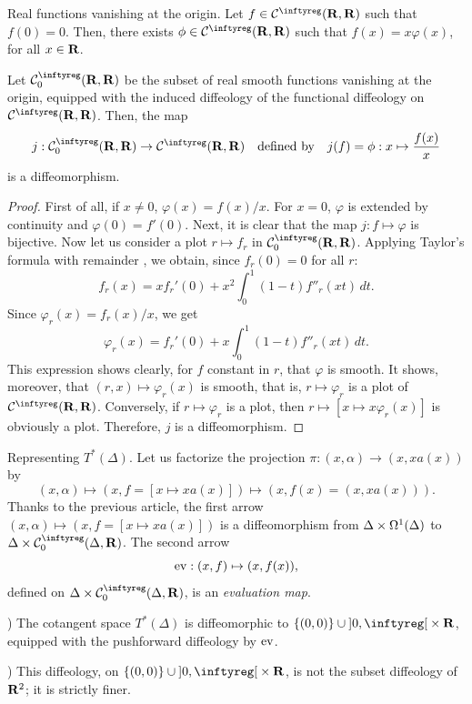 \begin{Article}{Real functions vanishing at the origin.}{}
  Let $f \in \Cinfty(\RR,\RR)$ such that $f(0)=0$.
  Then,
  there exists $\varphi \in \Cinfty(\RR,\RR)$ such that $f(x)=x\varphi(x)$,
  for all $x \in \mathbf{R}$.
  
  Let $\Cinfty_0(\RR,\RR)$ be the subset of real smooth functions vanishing at the origin,
  equipped with the induced diffeology of the functional diffeology on $\Cinfty(\RR,\RR)$.
  Then, the map
  $$
    j : \Cinfty_0(\RR,\RR) \to \Cinfty(\RR,\RR)
    \quad \mbox{defined by} \quad
    j(f) = \varphi : x \mapsto {f(x) \over x}
    $$
  is a diffeomorphism.
\end{Article}

\begin{proof}
  First of all,
  if $x\neq 0$, $\varphi(x) = f(x)/x$.
  For $x=0$, $\varphi$ is extended by continuity and $\varphi(0)=f'(0)$.
  Next,
  it is clear that the map $j : f\mapsto \varphi$ is bijective.
  Now let us consider a plot $r \mapsto f_r$ in $\Cinfty_0(\RR,\RR)$.
  Applying Taylor's formula with remainder \cite[\textsection\,8.14.3]{Die70a},
  we obtain,
  since $f_r(0)=0$ for all $r$:
  $$
    f_r(x) = x f_r'(0) + x^2\int_0^1(1-t) f''_r(xt)\, dt.
    $$
  Since $\varphi_r(x) = f_r(x)/x$, we get
  $$
    \varphi_r(x) = f_r'(0) + x\int_0^1(1-t) f''_r(xt)\, dt.
    $$
  This expression shows clearly,
  for $f$ constant in $r$,
  that $\varphi$ is smooth.
  It shows,
  moreover,
  that $(r,x) \mapsto \varphi_r(x)$ is smooth,
  that is,
  $r \mapsto \varphi_r$ is a plot of $\Cinfty(\RR,\RR)$.
  Conversely,
  if $r \mapsto \varphi_r$ is a plot,
  then $r \mapsto [x \mapsto x\varphi_r(x)]$ is obviously a plot.
  Therefore,
  $j$ is a diffeomorphism.
\end{proof}

\begin{Article}{Representing $T^*(\Delta)$.}{}
  Let us factorize the projection $\pi : (x,\alpha) \to (x, x a(x))$ by
  $$
    (x,\alpha) \mapsto (x, f=[x\mapsto x a(x)]) \mapsto (x, f(x)=(x, x a(x))).
    $$
  Thanks to the previous article,
  the first arrow $(x,\alpha) \mapsto (x, f=[x\mapsto x a(x)])$ is a diffeomorphism from $\Delta \times \Omega^1(\Delta)$ to $\Delta \times \Cinfty_0(\Delta,\RR)$.
  The second arrow
  $$
    {\operatorname{ev}}: (x,f) \mapsto (x,f(x)),
    $$
  defined on $\Delta \times \Cinfty_0(\Delta,\RR)$, is an \textit{evaluation map}.
  
  \smallskip{}) The cotangent space $T^*(\Delta)$ is diffeomorphic to $\{(0,0)\} \cup \OpenInterval{0,\infty} \times \RR$,
  equipped with the pushforward diffeology by ${\operatorname{ev}}$.
  
  \smallskip{}) This diffeology,
  on $\{(0,0)\} \cup \OpenInterval{0,\infty} \times \RR$,
  is not the subset diffeology of $\mathbf{R}^2$;
  it is strictly finer.
\end{Article}

